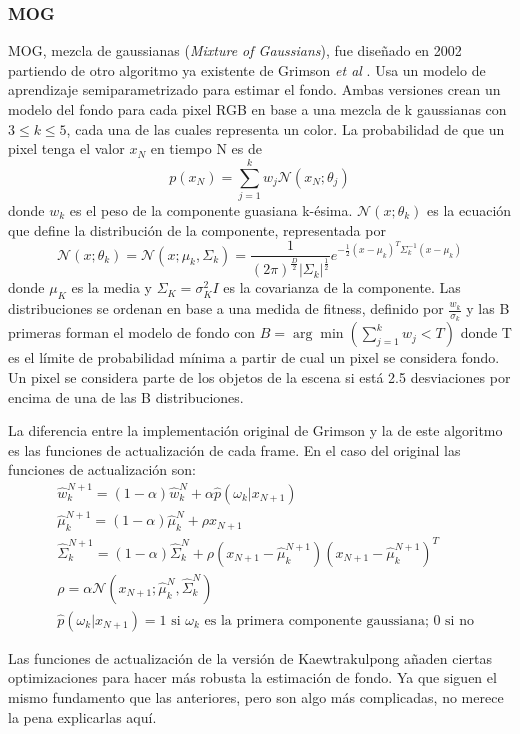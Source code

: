 \subsubsection*{MOG}
MOG, mezcla de gaussianas (\textit{Mixture of Gaussians}), fue diseñado en 2002 \cite{KaewTraKulPong2002} partiendo de otro algoritmo ya existente de Grimson \textit{et al} \cite{698583,784637,868677}. Usa un modelo de aprendizaje semiparametrizado para estimar el fondo. Ambas versiones crean un modelo del fondo para cada pixel RGB en base a una mezcla de k gaussianas con $3\leq k \leq 5$, cada una de las cuales representa un color. La probabilidad de que un pixel tenga el valor $x_N$ en tiempo N es de
\[
    p(x_N) = \sum_{j=1}^{k} w_j \mathcal{N} (x_N;\theta_j )
\]
donde $w_k$ es el peso de la componente guasiana k-ésima. $\mathcal{N} (x;\theta_k)$ es la ecuación que define la distribución de la componente, representada por
\[
    \mathcal{N}(x;\theta_k) = \mathcal{N}(x;\mu_k, \Sigma_k) = \frac{1}{(2\pi)^{\frac{D}{2}}|\Sigma_k|^\frac{1}{2}}e^{-\frac{1}{2}(x-\mu_k)^T\Sigma_k^{-1}(x-\mu_k)}
\]
donde $\mu_K$ es la media y $\Sigma_K = \sigma_K^2I$ es la covarianza de la componente. Las distribuciones se ordenan en base a una medida de fitness, definido por $\frac{w_k}{\sigma_k}$ y las B primeras forman el modelo de fondo con $B = \arg\min (\sum_{j=1}^{k} w_j < T)$ donde T es el límite de probabilidad mínima a partir de cual un pixel se considera fondo. Un pixel se considera parte de los objetos de la escena si está 2.5 desviaciones por encima de una de las B distribuciones.

La diferencia entre la implementación original de Grimson y la de este algoritmo es las funciones de actualización de cada frame. En el caso del original las funciones de actualización son: 
\begin{align*}
    &\hat{w}_k^{N+1} = (1 - \alpha)\hat{w}_k^{N} + \alpha\hat{p}(\omega_k | x_{N+1}) \\
    &\hat{\mu}_k^{N+1} = (1 - \alpha)\hat{\mu}_k^{N} + \rho x_{N+1} \\
    &\hat{\Sigma}_k^{N+1} = (1 - \alpha)\hat{\Sigma}_k^{N} + \rho (x_{N+1} - \hat{\mu}_k^{N+1})(x_{N+1} - \hat{\mu}_k^{N+1})^T \\
    &\rho = \alpha \mathcal{N}(x_{N+1};\hat{\mu}_k^N, \hat{\Sigma}_k^N) \\
    &\hat{p}(\omega_k | x_{N+1}) = \text{1 si $\omega_k$ es la primera componente gaussiana; 0 si no}
\end{align*}

Las funciones de actualización de la versión de Kaewtrakulpong añaden ciertas optimizaciones para hacer más robusta la estimación de fondo. Ya que siguen el mismo fundamento que las anteriores, pero son algo más complicadas, no merece la pena explicarlas aquí.

